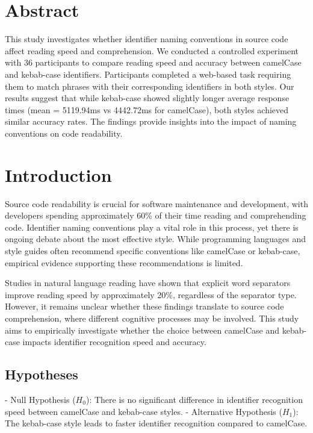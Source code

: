\documentclass[unicode,11pt,a4paper,oneside,numbers=endperiod,openany]{scrartcl}
\begin{document}
\setassignment
{}

\newline


\section{Abstract}
This study investigates whether identifier naming conventions in source code affect reading speed and comprehension. We conducted a controlled experiment with 36 participants to compare reading speed and accuracy between camelCase and kebab-case identifiers. Participants completed a web-based task requiring them to match phrases with their corresponding identifiers in both styles. Our results suggest that while kebab-case showed slightly longer average response times (mean = 5119.94ms vs 4442.72ms for camelCase), both styles achieved similar accuracy rates. The findings provide insights into the impact of naming conventions on code readability.

\section{Introduction}
Source code readability is crucial for software maintenance and development, with developers spending approximately 60\% of their time reading and comprehending code. Identifier naming conventions play a vital role in this process, yet there is ongoing debate about the most effective style. While programming languages and style guides often recommend specific conventions like camelCase or kebab-case, empirical evidence supporting these recommendations is limited.

Studies in natural language reading have shown that explicit word separators improve reading speed by approximately 20\%, regardless of the separator type. However, it remains unclear whether these findings translate to source code comprehension, where different cognitive processes may be involved. This study aims to empirically investigate whether the choice between camelCase and kebab-case impacts identifier recognition speed and accuracy.

\subsection{Hypotheses}
- Null Hypothesis ($H_0$): There is no significant difference in identifier recognition speed between camelCase and kebab-case styles.
- Alternative Hypothesis ($H_1$): The kebab-case style leads to faster identifier recognition compared to camelCase.
\end{document}

